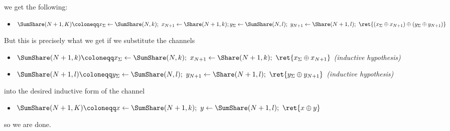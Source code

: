 \begin{itemize}
\begin{itemize}
\end{itemize}
we get the following:
\begin{itemize}
\item $\SumShare(N+1,K) \coloneqq x_\Sigma \leftarrow \SumShare(N,k); \ x_{N+1} \leftarrow \Share(N+1,k); \\ y_\Sigma \leftarrow \SumShare(N,l); \ y_{N+1} \leftarrow \Share(N+1,l); \ \ret{(x_\Sigma \oplus x_{N+1}) \oplus (y_\Sigma \oplus y_{N+1})}$
\end{itemize}
But this is precisely what we get if we substitute the channels
\begin{itemize}
\item $\SumShare(N+1,k) \coloneqq x_\Sigma \leftarrow \SumShare(N,k); \ x_{N+1} \leftarrow \Share(N+1,k); \ \ret{x_\Sigma \oplus x_{N+1}}$ \emph{(inductive hypothesis)}
\item $\SumShare(N+1,l) \coloneqq y_\Sigma \leftarrow \SumShare(N,l); \ y_{N+1} \leftarrow \Share(N+1,l); \ \ret{y_\Sigma \oplus y_{N+1}}$ \emph{(inductive hypothesis)}
\end{itemize}
into the desired inductive form of the channel
\begin{itemize}
\item $\SumShare(N+1,K) \coloneqq x \leftarrow \SumShare(N+1,k); \ y \leftarrow \SumShare(N+1,l); \ \ret{x \oplus y}$
\end{itemize}
so we are done.


\end{itemize}
